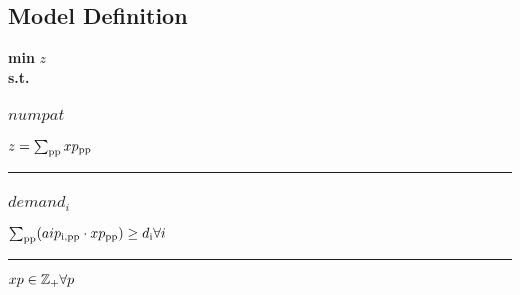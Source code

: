 \documentclass[11pt]{article}
\begin{document}
\subsection*{Model Definition}
\textbf{min} $z$\\
\textbf{s.t.}
\subsubsection*{$numpat$}
$
z = \sum_\text{pp} xp_\text{\text{pp}}
$
\vspace{5pt}
\hrule
\subsubsection*{$demand_{i}$}
$
\sum_\text{pp} (aip_\text{\text{i},\text{pp}} \cdot xp_\text{\text{pp}}) \geq d_\text{\text{i}}\hfill \forall i
$
\vspace{5pt}
\hrule
\bigskip
$xp\in \mathbb{Z}_{+} \forall p\\$
\end{document}
